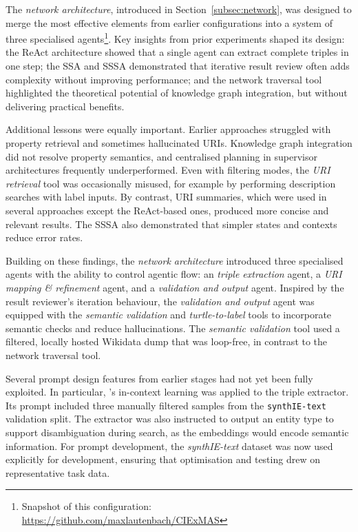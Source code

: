 \documentclass[a4paper,oneside,bibliography=totoc]{scrbook}
\begin{document}
The \textit{network architecture}, introduced in Section~\ref{subsec:network}, was designed to merge the most effective elements from earlier configurations into a system of three specialised agents\footnote{Snapshot of this configuration: \url{https://github.com/maxlautenbach/CIExMAS}}. Key insights from prior experiments shaped its design: the ReAct architecture showed that a single agent can extract complete triples in one step; the \ac{SSA} and \ac{SSSA} demonstrated that iterative result review often adds complexity without improving performance; and the network traversal tool highlighted the theoretical potential of knowledge graph integration, but without delivering practical benefits.

Additional lessons were equally important. Earlier approaches struggled with property retrieval and sometimes hallucinated URIs. Knowledge graph integration did not resolve property semantics, and centralised planning in supervisor architectures frequently underperformed. Even with filtering modes, the \textit{URI retrieval} tool was occasionally misused, for example by performing description searches with label inputs. By contrast, URI summaries, which were used in several approaches except the ReAct-based ones, produced more concise and relevant results. The \ac{SSSA} also demonstrated that simpler states and contexts reduce error rates.

Building on these findings, the \textit{network architecture} introduced three specialised agents with the ability to control agentic flow: an \textit{triple extraction} agent, a \textit{URI mapping \& refinement} agent, and a \textit{validation and output} agent. Inspired by the result reviewer’s iteration behaviour, the \textit{validation and output} agent was equipped with the \textit{semantic validation} and \textit{turtle-to-label} tools to incorporate semantic checks and reduce hallucinations. The \textit{semantic validation} tool used a filtered, locally hosted Wikidata dump that was loop-free, in contrast to the network traversal tool.

Several prompt design features from earlier stages had not yet been fully exploited. In particular, \citet{Brown2020}’s in-context learning was applied to the triple extractor. Its prompt included three manually filtered samples from the \texttt{synthIE-text} validation split. The extractor was also instructed to output an entity type to support disambiguation during search, as the embeddings would encode semantic information. For prompt development, the \textit{synthIE-text} dataset was now used explicitly for development, ensuring that optimisation and testing drew on representative task data.
\end{document}

